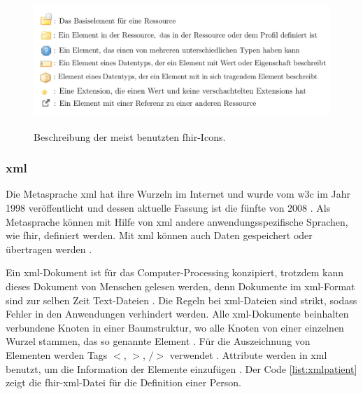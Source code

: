 \begin{figure}[ht]
	\centering
	\includegraphics[height=5cm]{figures/icons_description}
	\caption[Beschreibung der meist benutzten \acs{fhir}-Icons]{Beschreibung der meist benutzten \acs{fhir}-Icons.}
	\label{fig:icons}
\end{figure}


\subsubsection{\acs{xml}} \label{subsubsec:xml}

Die Metasprache \acf{xml} hat ihre Wurzeln im Internet und wurde vom \ac{w3c} im Jahr 1998 veröffentlicht und dessen aktuelle Fassung ist die fünfte von 2008 \cite{grundinfo}. Als Metasprache können mit Hilfe von \ac{xml} andere anwendungsspezifische Sprachen, wie \ac{fhir}, definiert werden. Mit \ac{xml} können auch Daten gespeichert oder übertragen werden \cite{interop, grundinfo}.

Ein \ac{xml}-Dokument ist für das Computer-Processing konzipiert, trotzdem kann dieses Dokument von Menschen gelesen werden, denn Dokumente im \ac{xml}-Format sind zur selben Zeit Text-Dateien \cite{grundinfo}. Die Regeln bei \ac{xml}-Dateien sind strikt, sodass Fehler in den Anwendungen verhindert werden. Alle \ac{xml}-Dokumente beinhalten verbundene Knoten in einer Baumstruktur, wo alle Knoten von einer einzelnen Wurzel stammen, das so genannte Element \cite{interop}. Für die Auszeichnung von Elementen werden Tags \glqq $<$, $>$, $/$$>$ \grqq{} verwendet \cite{grundinfo}. Attribute werden in \ac{xml} benutzt, um die Information der Elemente einzufügen \cite{interop, quality}. Der Code \ref{list:xmlpatient} zeigt die \ac{fhir}-\ac{xml}-Datei für die Definition einer Person.

